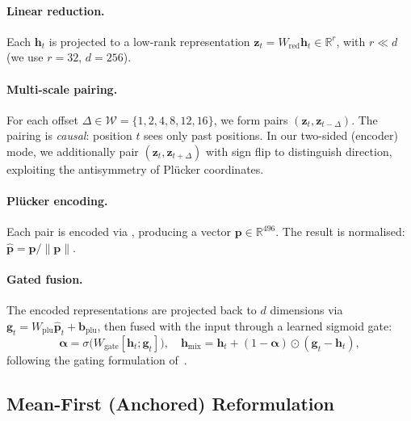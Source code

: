 \documentclass[11pt,a4paper]{article}
\newcommand{\R}{\mathbb{R}}
\newcommand{\plucker}{Pl\"{u}cker}
\begin{document}
\paragraph{Linear reduction.}  Each $\bm{h}_t$ is projected to a
low-rank representation $\bm{z}_t = W_{\mathrm{red}} \bm{h}_t \in
\R^r$, with $r \ll d$ (we use $r=32$, $d=256$).

\paragraph{Multi-scale pairing.}  For each offset $\Delta \in
\mathcal{W} = \{1, 2, 4, 8, 12, 16\}$, we form pairs $(\bm{z}_t,
\bm{z}_{t-\Delta})$.  The pairing is \emph{causal}: position $t$ sees
only past positions.  In our two-sided (encoder) mode, we additionally
pair $(\bm{z}_t, \bm{z}_{t+\Delta})$ with sign flip to distinguish
direction, exploiting the antisymmetry of \plucker{} coordinates.

\paragraph{\plucker{} encoding.}  Each pair is encoded via
, producing a vector $\bm{p} \in \R^{496}$.  The
result is normalised: $\hat{\bm{p}} = \bm{p} / \|\bm{p}\|$.

\paragraph{Gated fusion.}  The encoded representations are projected
back to $d$ dimensions via $\bm{g}_t = W_{\mathrm{plu}} \hat{\bm{p}}_t
+ \bm{b}_{\mathrm{plu}}$, then fused with the input through a learned
sigmoid gate:
\begin{equation}
  \bm{\alpha} = \sigma\bigl(W_{\mathrm{gate}}[\bm{h}_t; \bm{g}_t]\bigr),
  \quad
  \bm{h}_{\mathrm{mix}} = \bm{h}_t + (1 - \bm{\alpha}) \odot
  (\bm{g}_t - \bm{h}_t),
  \label{eq:gate}
\end{equation}
following the gating formulation of~\citet{dong2025attention}.

\subsection{Mean-First (Anchored) Reformulation}
\end{document}

